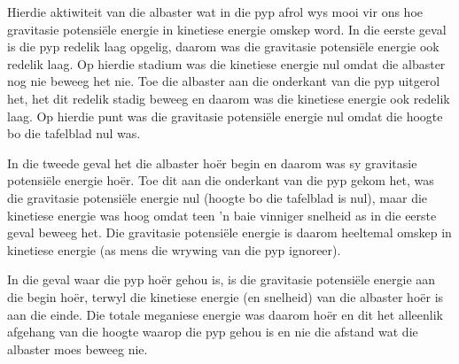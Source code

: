  Hierdie aktiwiteit van die albaster wat in die pyp afrol wys mooi vir ons hoe gravitasie potensiële energie in kinetiese energie omskep word. In die eerste geval is die pyp redelik laag opgelig, daarom was die gravitasie potensiële energie ook redelik laag. Op hierdie stadium was die kinetiese energie nul omdat die albaster nog nie beweeg het nie. Toe die albaster aan die onderkant van die pyp uitgerol het, het dit redelik stadig beweeg en daarom was die kinetiese energie ook redelik laag. Op hierdie punt was die gravitasie potensiële energie nul omdat die hoogte bo die tafelblad nul was.

In die tweede geval het die albaster hoër begin en daarom was sy gravitasie potensiële energie hoër.  Toe dit aan die onderkant van die pyp gekom het, was die gravitasie potensiële energie nul (hoogte bo die tafelblad is nul), maar die kinetiese energie was hoog omdat teen   'n baie vinniger snelheid as in die eerste geval beweeg het. Die gravitasie potensiële energie is daarom heeltemal omskep in kinetiese energie (as mens die wrywing van die pyp ignoreer).

In die geval waar die pyp hoër gehou is, is die gravitasie potensiële energie aan die begin hoër, terwyl die kinetiese energie (en snelheid) van die albaster hoër is aan die einde. Die totale meganiese energie was daarom hoër en dit het alleenlik afgehang van die hoogte waarop die pyp gehou is en nie die afstand wat die albaster moes beweeg nie.


